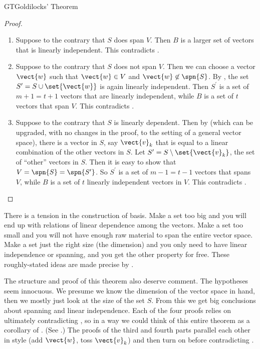 \begin{subsect}{GT}{Goldilocks' Theorem}
\begin{proof}
\begin{para}
\begin{enumerate}
%
\item Suppose to the contrary that $S$ does span $V$.  Then $B$ is a larger set of vectors that is linearly independent.   This contradicts .
%
\item Suppose to the contrary that $S$ does not span $V$.  Then we can choose a vector $\vect{w}$ such that $\vect{w}\in V$ and $\vect{w}\not\in\spn{S}$.  By , the set $S^\prime=S\cup\set{\vect{w}}$ is again linearly independent.  Then $S^\prime$ is a set of $m+1=t+1$ vectors that are linearly independent, while $B$ is a set of $t$ vectors that span $V$.    This contradicts .
%
\item Suppose to the contrary that $S$ is linearly dependent.  Then by  (which can be upgraded, with no changes in the proof, to the setting of a general vector space), there is a vector in $S$, say $\vect{v}_k$ that is equal to a linear combination of the other vectors in $S$.  Let $S^\prime=S\setminus\set{\vect{v}_k}$, the set of ``other'' vectors in $S$.  Then it is easy to show that $V=\spn{S}=\spn{S^\prime}$.  So $S^\prime$ is a set of $m-1=t-1$ vectors that spans $V$, while $B$ is a set of $t$ linearly independent vectors in $V$.  This contradicts .
%
\end{enumerate}
\end{para}
%
\end{proof}
%
\begin{para}There is a tension in the construction of basis.  Make a set too big and you will end up with relations of linear dependence among the vectors.  Make a set too small and you will not have enough raw material to span the entire vector space.  Make a set just the right size (the dimension) and you only need to have linear independence or spanning, and you get the other property for free.  These roughly-stated ideas are made precise by .\end{para}
%
\begin{para}The structure and proof of this theorem also deserve comment.  The hypotheses seem innocuous.  We presume we know the dimension of the vector space in hand, then we mostly just look at the size of the set $S$. From this we get big conclusions about spanning and linear independence.  Each of the four proofs relies on ultimately contradicting , so in a way we could think of this entire theorem as a corollary of .    (See .) The proofs of the third and fourth parts parallel each other in style (add $\vect{w}$, toss $\vect{v}_k$) and then turn on  before contradicting .\end{para}

\end{subsect}
